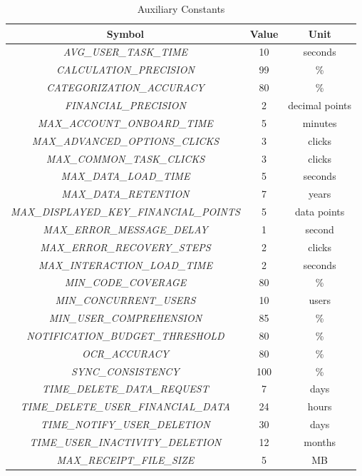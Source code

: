 \documentclass[12pt]{article}
\begin{document}
\begin{table}[H]
  \caption{Auxiliary Constants}\label{Table:AuxConstants}
  \centering
  \begin{tabular}{|c|c|c|}
    \hline
    \textbf{Symbol} & \textbf{Value} & \textbf{Unit} \\
    \hline
    \textit{AVG\_USER\_TASK\_TIME} & 10 & seconds \\
    \textit{CALCULATION\_PRECISION} & 99 & \%\\
    \textit{CATEGORIZATION\_ACCURACY} & 80 & \%\\
    \textit{FINANCIAL\_PRECISION} & 2 & decimal points\\
    \textit{MAX\_ACCOUNT\_ONBOARD\_TIME} & 5 & minutes \\
    \textit{MAX\_ADVANCED\_OPTIONS\_CLICKS} & 3 & clicks \\
    \textit{MAX\_COMMON\_TASK\_CLICKS} & 3 & clicks \\
    \textit{MAX\_DATA\_LOAD\_TIME} & 5 & seconds \\
    \textit{MAX\_DATA\_RETENTION} & 7 & years \\
    \textit{MAX\_DISPLAYED\_KEY\_FINANCIAL\_POINTS} & 5 & data points \\
    \textit{MAX\_ERROR\_MESSAGE\_DELAY} & 1 & second \\
    \textit{MAX\_ERROR\_RECOVERY\_STEPS} & 2 & clicks \\
    \textit{MAX\_INTERACTION\_LOAD\_TIME} & 2 & seconds \\
    \textit{MIN\_CODE\_COVERAGE} & 80 & \% \\
    \textit{MIN\_CONCURRENT\_USERS} & 10 & users \\
    \textit{MIN\_USER\_COMPREHENSION} & 85 & \% \\
    \textit{NOTIFICATION\_BUDGET\_THRESHOLD} & 80 & \%\\\label{NOTIFICATION_BUDGET_THRESHOLD}
    \textit{OCR\_ACCURACY} & 80 & \%\\
    \textit{SYNC\_CONSISTENCY} & 100 & \%\\
    \textit{TIME\_DELETE\_DATA\_REQUEST} & 7 & days \\
    \textit{TIME\_DELETE\_USER\_FINANCIAL\_DATA} & 24 & hours \\
    \textit{TIME\_NOTIFY\_USER\_DELETION} & 30 & days \\
    \textit{TIME\_USER\_INACTIVITY\_DELETION} & 12 & months \\
    \textit{MAX\_RECEIPT\_FILE\_SIZE} & 5 & MB \\

    \hline
  \end{tabular}
\end{table}
\end{document}

